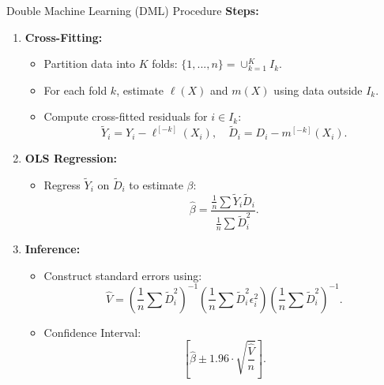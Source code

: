 \documentclass[xcolor=svgnames,t]{beamer}
\begin{document}
            \begin{frame}{Double Machine Learning (DML) Procedure}
                \textbf{Steps:}
                \begin{enumerate}
                    \item \textbf{Cross-Fitting:}
                    \begin{itemize}
                        \item Partition data into \(K\) folds: \(\{1, ..., n\} = \cup_{k=1}^K I_k\).
                        \item For each fold \(k\), estimate \(\ell(X)\) and \(m(X)\) using data outside \(I_k\).
                        \item Compute cross-fitted residuals for \(i \in I_k\):
                        \[
                        \tilde{Y}_i = Y_i - \ell^{[-k]}(X_i), \quad \tilde{D}_i = D_i - m^{[-k]}(X_i).
                        \]
                    \end{itemize}
                    \pause
                    \item \textbf{OLS Regression:}
                    \begin{itemize}
                        \scriptsize
                        \item Regress \(\tilde{Y}_i\) on \(\tilde{D}_i\) to estimate \(\beta\):
                        \[
                        \hat{\beta} = \frac{\frac{1}{n}\sum \tilde{Y}_i \tilde{D}_i}{\frac{1}{n}\sum \tilde{D}_i^2}.
                        \]
                    \end{itemize}
                    \pause
                    \scriptsize
                    \item \textbf{Inference:}
                    \begin{itemize}

                        \item Construct standard errors using:
                        \scriptsize
                        \[
                        \hat{V} = \left(\frac{1}{n}\sum \tilde{D}_i^2\right)^{-1}\left(\frac{1}{n}\sum \tilde{D}_i^2 \epsilon_i^2\right)\left(\frac{1}{n}\sum \tilde{D}_i^2\right)^{-1}.
                        \]
                        \item Confidence Interval:
                     \scriptsize
                        \[
                        \left[\hat{\beta} \pm 1.96 \cdot \sqrt{\frac{\hat{V}}{n}}\right].
                        \]
                    \end{itemize}
                \end{enumerate}
                \end{frame}
\end{document}
